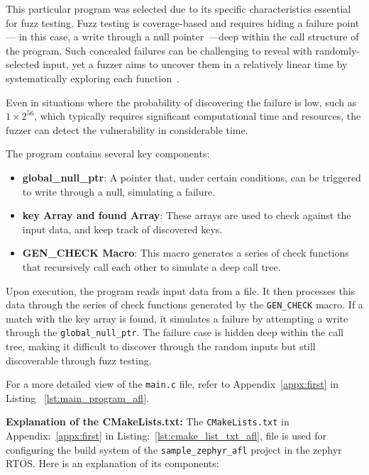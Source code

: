This particular program was selected due to its specific characteristics
essential for fuzz testing. Fuzz testing is coverage-based and requires hiding a
failure point— in this case, a write through a null pointer~\cite{spoto2011precise}—deep within the call
structure of the program. Such concealed failures can be challenging to reveal
with randomly-selected input, yet a fuzzer aims to uncover them in a relatively
linear time by systematically exploring each function~\cite{FuzzingE54:online0}\cite{linssen2020snpfuzz}.

Even in situations where the probability of discovering the failure is low,
such as \(1 \times 2^{56}\), which typically requires significant computational
time and resources, the fuzzer can detect the vulnerability in considerable time.

The program contains several key components:

\begin{itemize}
\item \textbf{global\_null\_ptr}: A pointer that, under certain conditions,
can be triggered to write through a null, simulating a failure.
\item \textbf{key Array and found Array}: These arrays are used to check against
the input data, and keep track of discovered keys.
\item \textbf{GEN\_CHECK Macro}: This macro generates a series of check
functions that recursively call each other to simulate a deep call tree.
\end{itemize}

Upon execution, the program reads input data from a file. It then processes
this data through the series of check functions generated by
the \texttt{GEN\_CHECK} macro. If a match with the key array is found,
it simulates a failure by attempting a write through the \texttt{global\_null\_ptr}.
The failure case is hidden deep within the call tree, making it difficult to
discover through the random inputs but still discoverable through fuzz testing.

For a more detailed view of the \texttt{main.c} file, refer to
Appendix~\ref{appx:first} in Listing ~\ref{lst:main_program_afl}.

\textbf{Explanation of the CMakeLists.txt:}
The \texttt{CMakeLists.txt} in Appendix:~\ref{appx:first} in
Listing:~\ref{lst:cmake_list_txt_afl}, file is used for configuring the build system
of the \texttt{sample\_zephyr\_afl} project in the zephyr RTOS. Here is an
explanation of its components:

